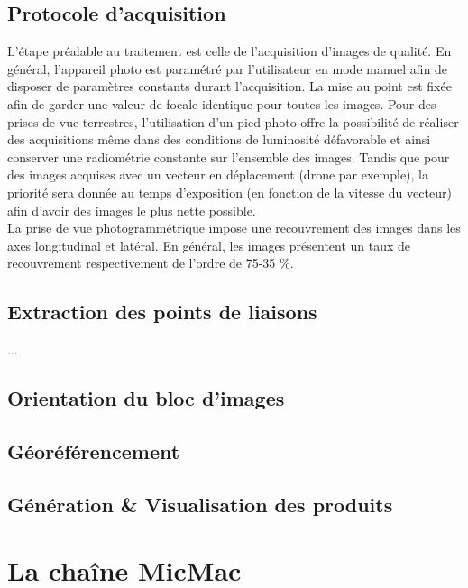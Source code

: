 \documentclass[a4paper,10pt]{article} %
\begin{document}
\subsection{Protocole d'acquisition}
L'étape préalable au traitement est celle de l'acquisition d'images de qualité. En général, l'appareil photo est paramétré par l'utilisateur en mode manuel afin de disposer de paramètres constants durant l’acquisition. La mise au point est fixée afin de garder une valeur de focale identique pour toutes les images. Pour des prises de vue terrestres, l'utilisation d'un pied photo offre la possibilité de réaliser des acquisitions même dans des conditions de luminosité défavorable et ainsi conserver une radiométrie constante sur l'ensemble des images. Tandis que pour des images acquises avec un vecteur en déplacement (drone par exemple), la priorité sera donnée au temps d'exposition (en fonction de la vitesse du vecteur) afin d'avoir des images le plus nette possible.\newline
\\
La prise de vue photogrammétrique impose une recouvrement des images dans les axes longitudinal et latéral. En général, les images présentent un taux de recouvrement respectivement de l'ordre de 75-35 $\%$.

\subsection{Extraction des points de liaisons}
...
\subsection{Orientation du bloc d'images}
\subsection{Géoréférencement}
\subsection{Génération \& Visualisation des produits}
\section{La chaîne MicMac}
\end{document}
